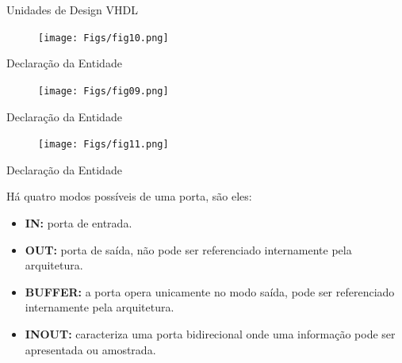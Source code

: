\documentclass[aspectratio=169]{beamer}
\begin{document}
\begin{frame}{Unidades de Design VHDL}
	\justifying
	
	
	\begin{figure}[h]
		\centering
		\texttt{[image: Figs/fig10.png]}
	\end{figure}
	
	
\end{frame}
\begin{frame}{Declaração da Entidade}
	\justifying
	
	
	\begin{figure}[h]
		\centering
		\texttt{[image: Figs/fig09.png]}
	\end{figure}
	
	
\end{frame}
\begin{frame}{Declaração da Entidade}
	\justifying
	
	
	\begin{figure}[h]
		\centering
		\texttt{[image: Figs/fig11.png]}
	\end{figure}
	
	
\end{frame}
\begin{frame}{Declaração da Entidade}
	\justifying
	
	Há quatro modos possíveis de uma porta, são eles:
	
	\begin{itemize}
		\item \textbf{IN:} porta de entrada.
		\item \textbf{OUT:} porta de saída, não pode ser referenciado internamente pela arquitetura.
		\item \textbf{BUFFER:} a porta opera unicamente no modo saída, pode ser referenciado internamente pela arquitetura.
		\item \textbf{INOUT:} caracteriza uma porta bidirecional onde uma informação pode ser apresentada ou amostrada.
	\end{itemize}
	
	
	
\end{frame}
\end{document}
